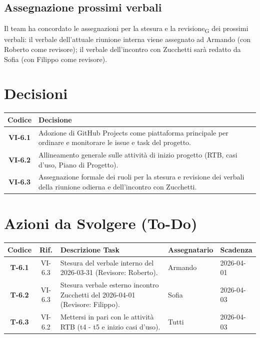 \subsection{Assegnazione prossimi verbali}
Il team ha concordato le assegnazioni per la stesura e la revisione\textsubscript{G} dei prossimi verbali: il verbale dell'attuale riunione interna viene assegnato ad Armando (con Roberto come revisore); il verbale dell'incontro con Zucchetti sarà redatto da Sofia (con Filippo come revisore).

\newpage
\section{Decisioni}

\begin{table}[ht]
	\centering
	\renewcommand{\arraystretch}{1.5}
	\begin{tabularx}{\textwidth}{c X}
		\toprule
		\textbf{Codice} & \textbf{Decisione} \\
		\midrule
		\textbf{VI-6.1} & Adozione di GitHub Projects come piattaforma principale per ordinare e monitorare le issue e task del progetto. \\
		\textbf{VI-6.2} & Allineamento generale sulle attività di inizio progetto (RTB, casi d'uso, Piano di Progetto). \\
		\textbf{VI-6.3} & Assegnazione formale dei ruoli per la stesura e revisione dei verbali della riunione odierna e dell'incontro con Zucchetti. \\
		\bottomrule
	\end{tabularx}
\end{table}

\section{Azioni da Svolgere (To-Do)}

\begin{table}[ht]
	\centering
	\renewcommand{\arraystretch}{1.5}
	\begin{tabularx}{\textwidth}{c c X l l}
		\toprule
		\textbf{Codice} & \textbf{Rif.} & \textbf{Descrizione Task} & \textbf{Assegnatario} & \textbf{Scadenza} \\
		\midrule
		\textbf{T-6.1} & VI-6.3 & Stesura del verbale interno del 2026-03-31 (Revisore: Roberto). & Armando & 2026-04-01 \\
		\textbf{T-6.2} & VI-6.3 & Stesura verbale esterno incontro Zucchetti del 2026-04-01 (Revisore: Filippo). & Sofia & 2026-04-03 \\
		\textbf{T-6.3} & VI-6.2 & Mettersi in pari con le attività RTB (t4 - t5 e inizio casi d'uso). & Tutti & 2026-04-03 \\
		\bottomrule
	\end{tabularx}
\end{table}


